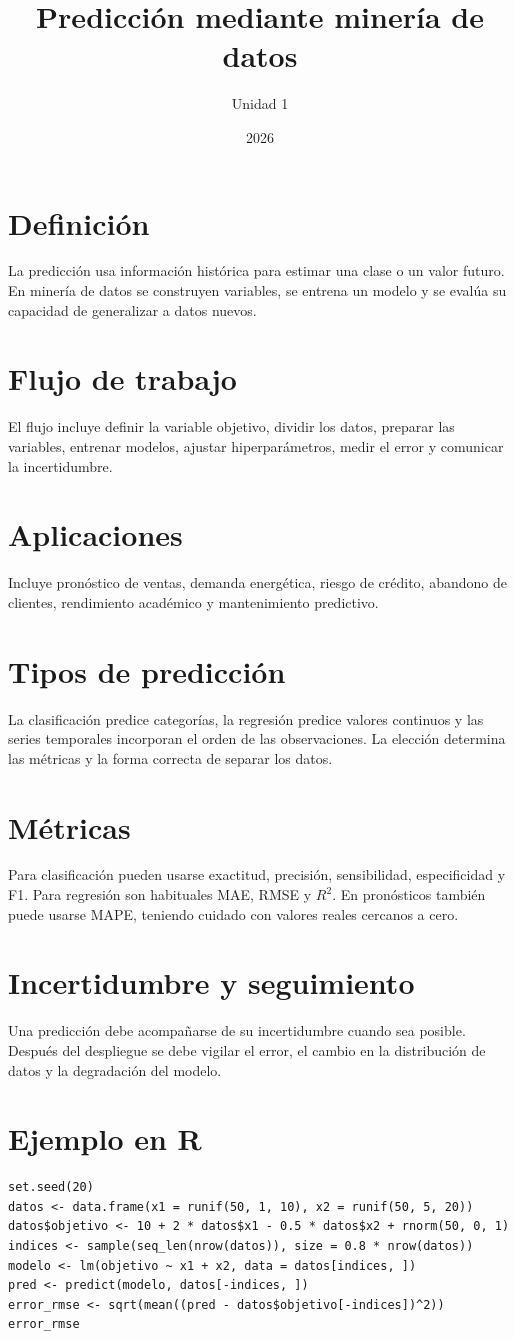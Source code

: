 \documentclass[12pt,a4paper]{article}
\title{Predicción mediante minería de datos}
\author{Unidad 1}
\date{2026}
\begin{document}
\maketitle
\section{Definición}
La predicción usa información histórica para estimar una clase o un valor futuro. En minería de datos se construyen variables, se entrena un modelo y se evalúa su capacidad de generalizar a datos nuevos.
\section{Flujo de trabajo}
El flujo incluye definir la variable objetivo, dividir los datos, preparar las variables, entrenar modelos, ajustar hiperparámetros, medir el error y comunicar la incertidumbre.
\section{Aplicaciones}
Incluye pronóstico de ventas, demanda energética, riesgo de crédito, abandono de clientes, rendimiento académico y mantenimiento predictivo.
\section{Tipos de predicción}
La clasificación predice categorías, la regresión predice valores continuos y las series temporales incorporan el orden de las observaciones. La elección determina las métricas y la forma correcta de separar los datos.
\section{Métricas}
Para clasificación pueden usarse exactitud, precisión, sensibilidad, especificidad y F1. Para regresión son habituales MAE, RMSE y $R^2$. En pronósticos también puede usarse MAPE, teniendo cuidado con valores reales cercanos a cero.
\section{Incertidumbre y seguimiento}
Una predicción debe acompañarse de su incertidumbre cuando sea posible. Después del despliegue se debe vigilar el error, el cambio en la distribución de datos y la degradación del modelo.
\section{Ejemplo en R}
\begin{lstlisting}
set.seed(20)
datos <- data.frame(x1 = runif(50, 1, 10), x2 = runif(50, 5, 20))
datos$objetivo <- 10 + 2 * datos$x1 - 0.5 * datos$x2 + rnorm(50, 0, 1)
indices <- sample(seq_len(nrow(datos)), size = 0.8 * nrow(datos))
modelo <- lm(objetivo ~ x1 + x2, data = datos[indices, ])
pred <- predict(modelo, datos[-indices, ])
error_rmse <- sqrt(mean((pred - datos$objetivo[-indices])^2))
error_rmse
\end{lstlisting}
\end{document}

